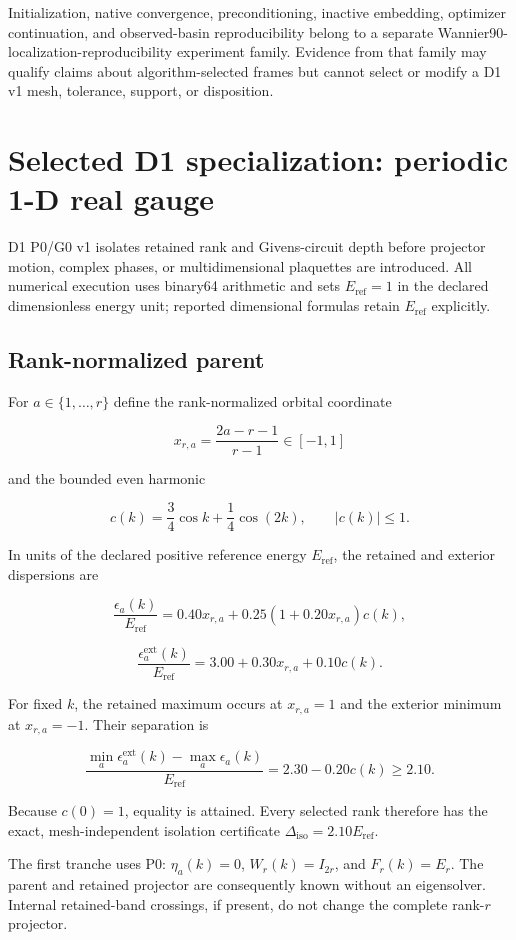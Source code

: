 \documentclass[11pt]{article}
\begin{document}
Initialization, native convergence, preconditioning, inactive embedding, optimizer
continuation, and observed-basin reproducibility belong to a separate
Wannier90-localization-reproducibility experiment family. Evidence from that family may
qualify claims about algorithm-selected frames but cannot select or modify a D1 v1 mesh,
tolerance, support, or disposition.

\section{Selected D1 specialization: periodic 1-D real gauge}

D1 P0/G0 v1 isolates retained rank and Givens-circuit depth before projector motion,
complex phases, or multidimensional plaquettes are introduced. All numerical execution
uses binary64 arithmetic and sets $E_{\mathrm{ref}}=1$ in the declared dimensionless
energy unit; reported dimensional formulas retain $E_{\mathrm{ref}}$ explicitly.

\subsection{Rank-normalized parent}

For $a\in\{1,\ldots,r\}$ define the rank-normalized orbital coordinate

\[
x_{r,a}=\frac{2a-r-1}{r-1}\in[-1,1]
\]

and the bounded even harmonic

\[
c(k)=\frac34\cos k+\frac14\cos(2k),
\qquad |c(k)|\leq1.
\]

In units of the declared positive reference energy $E_{\mathrm{ref}}$, the retained and
exterior dispersions are

\[
\frac{\epsilon_a(k)}{E_{\mathrm{ref}}}
=0.40x_{r,a}+0.25\left(1+0.20x_{r,a}\right)c(k),
\]

\[
\frac{\epsilon_a^{\mathrm{ext}}(k)}{E_{\mathrm{ref}}}
=3.00+0.30x_{r,a}+0.10c(k).
\]

For fixed $k$, the retained maximum occurs at $x_{r,a}=1$ and the exterior minimum at
$x_{r,a}=-1$. Their separation is

\[
\frac{\min_a\epsilon_a^{\mathrm{ext}}(k)-\max_a\epsilon_a(k)}
{E_{\mathrm{ref}}}
=2.30-0.20c(k)\geq2.10.
\]

Because $c(0)=1$, equality is attained. Every selected rank therefore has the exact,
mesh-independent isolation certificate
$\Delta_{\mathrm{iso}}=2.10E_{\mathrm{ref}}$.

The first tranche uses P0: $\eta_a(k)=0$, $W_r(k)=I_{2r}$, and
$F_r(k)=E_r$. The parent and retained projector are consequently known without an
eigensolver. Internal retained-band crossings, if present, do not change the complete
rank-$r$ projector.
\end{document}
